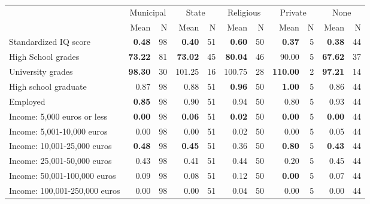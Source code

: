 \begin{tabular}{l r r r r r r r r r r}
\toprule
& \multicolumn{2}{c}{Municipal} & \multicolumn{2}{c}{State} & \multicolumn{2}{c}{Religious} & \multicolumn{2}{c}{Private} & \multicolumn{2}{c}{None} \\
& \scriptsize Mean & \scriptsize N & \scriptsize Mean & \scriptsize N & \scriptsize Mean & \scriptsize N & \scriptsize Mean & \scriptsize N & \scriptsize Mean & \scriptsize N \\
\midrule
Standardized IQ score & \textbf{     0.48} &        98 & \textbf{     0.40} &        51 & \textbf{     0.60} &        50 & \textbf{     0.37} &         5 & \textbf{     0.38} &        44 \\
High School grades & \textbf{    73.22} &        81 & \textbf{    73.02} &        45 & \textbf{    80.04} &        46 &     90.00 &         5 & \textbf{    67.62} &        37 \\
University grades & \textbf{    98.30} &        30 &    101.25 &        16 &    100.75 &        28 & \textbf{   110.00} &         2 & \textbf{    97.21} &        14 \\
High school graduate &      0.87 &        98 &      0.88 &        51 & \textbf{     0.96} &        50 & \textbf{     1.00} &         5 &      0.86 &        44 \\
Employed & \textbf{     0.85} &        98 &      0.90 &        51 &      0.94 &        50 &      0.80 &         5 &      0.93 &        44 \\
Income: 5,000 euros or less & \textbf{     0.00} &        98 & \textbf{     0.06} &        51 & \textbf{     0.02} &        50 & \textbf{     0.00} &         5 & \textbf{     0.00} &        44 \\
Income: 5,001-10,000 euros &      0.00 &        98 &      0.00 &        51 &      0.02 &        50 &      0.00 &         5 &      0.05 &        44 \\
Income: 10,001-25,000 euros & \textbf{     0.48} &        98 & \textbf{     0.45} &        51 &      0.36 &        50 & \textbf{     0.80} &         5 & \textbf{     0.43} &        44 \\
Income: 25,001-50,000 euros &      0.43 &        98 &      0.41 &        51 &      0.44 &        50 &      0.20 &         5 &      0.45 &        44 \\
Income: 50,001-100,000 euros &      0.09 &        98 &      0.08 &        51 &      0.12 &        50 & \textbf{     0.00} &         5 &      0.07 &        44 \\
Income: 100,001-250,000 euros &      0.00 &        98 &      0.00 &        51 &      0.04 &        50 &      0.00 &         5 &      0.00 &        44 \\

\end{tabular}
